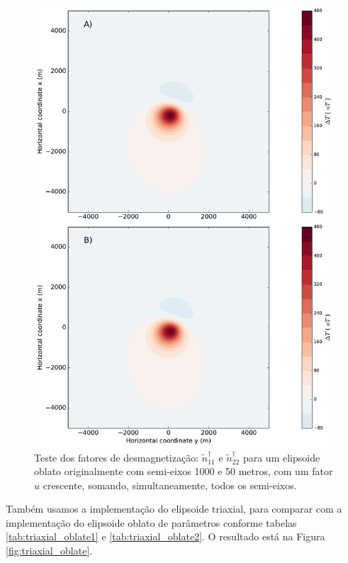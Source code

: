 \begin{figure}[hbt!]
	\centering \includegraphics[width=14 cm,height=21 cm]{figures/ellipsoid_triaxial_prolate}
	\caption[Comparação da anomalia de campo total aproximada entre um elipsoide triaxial com um dos semi-eixos mais alongado que o 
		restante e um elipsoide prolato.]{Teste dos fatores de desmagnetização:
		$\tilde{n}^{\dagger}_{11}$ e $\tilde{n}^{\dagger}_{22}$
		para um elipsoide oblato originalmente com semi-eixos 1000 e 50 metros, com um fator $u$ crescente,
		somando, simultaneamente, todos os semi-eixos.}
	\label{fig:triaxial_prolate}
\end{figure}

 Também usamos a implementação do elipsoide triaxial, para comparar com a implementação do elipsoide oblato de parâmetros conforme tabelas \ref{tab:triaxial_oblate1} e \ref{tab:triaxial_oblate2}. O resultado está na Figura \ref{fig:triaxial_oblate}.

